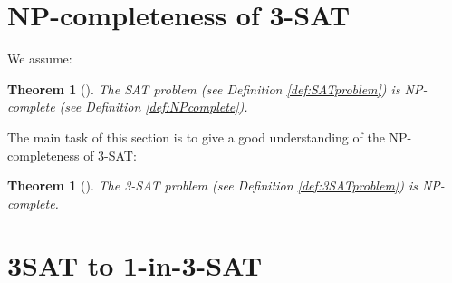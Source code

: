 \documentclass[a4paper]{report}
\newtheorem{thm}[defi]{Theorem}
\begin{document}
\section{NP-completeness of 3-SAT}
\label{sec:3SATNPcomp}

We assume:
\begin{thm}[{{\cite[Theorem 1]{Cook1971NP}}}]\label{thm:SATNPcomplete}
  The SAT problem (see Definition \ref{def:SATproblem}) is NP-complete (see Definition \ref{def:NPcomplete}).
\end{thm}

The main task of this section is to give a good understanding of the NP-completeness of 3-SAT:
\begin{thm}[{{\cite[Theorem 2]{Cook1971NP}}}]\label{thm:SATNPcomplete}
  The 3-SAT problem (see Definition \ref{def:3SATproblem}) is NP-complete.
\end{thm}





\section{3SAT to 1-in-3-SAT}
\label{sec:3satto13}





\end{document}
